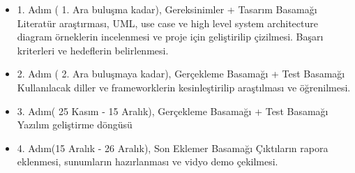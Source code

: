 \begin{itemize}
  \item 1. Adım ( 1. Ara buluşma kadar), Gereksinimler + Tasarım Basamağı
  \newline
Literatür araştırması, UML, use case ve high level system architecture diagram örneklerin incelenmesi ve proje için geliştirilip çizilmesi. Başarı kriterleri ve hedeflerin belirlenmesi.
  \item 2. Adım ( 2. Ara buluşmaya kadar), Gerçekleme Basamağı + Test Basamağı
  \newline
Kullanılacak diller ve frameworklerin kesinleştirilip araştılması ve öğrenilmesi.
  \item 3. Adım( 25 Kasım - 15 Aralık), Gerçekleme Basamağı + Test Basamağı
  \newline
Yazılım geliştirme döngüsü
  \item 4. Adım(15 Aralık - 26 Aralık), Son Eklemer Basamağı
  \newline
Çıktıların rapora eklenmesi, sunumların hazırlanması ve vidyo demo çekilmesi.
\end{itemize}

